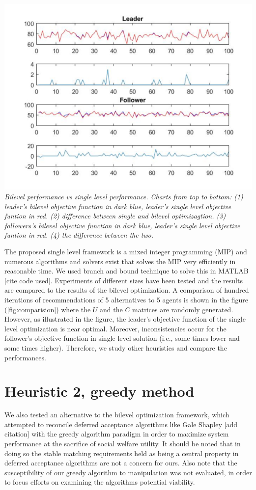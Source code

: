 \documentclass[11pt, letterpaper]{article}
\begin{document}
\includegraphics[]{comparison.png}
\\
\caption{\emph{Bilevel performance vs single level performance. Charts from top to bottom: (1) leader's bilevel objective function in dark blue, leader's single level objective funtion in red. (2) difference between single and bilevel optimizagtion. (3) followers's bilevel objective function in dark blue, leader's single level objective funtion in red. (4) the difference between the two. }}   
\label{fig:comparision}
\noindent

The proposed single level framework is a mixed integer programming (MIP) and numerous algorithms and solvers exist that solves the MIP very efficiently in reasonable time. We used branch and bound technique to solve this in MATLAB [cite code used]. Experiments of different sizes have been tested and the results are compared to the results of the bilevel optimization. A comparison of hundred iterations of recommendations of 5 alternatives to 5 agents is shown in the figure (\ref{fig:comparision}) where the $U$ and the $C$ matrices are randomly generated. However, as illustrated in the figure, the leader's objective function of the single level optimization is near optimal. Moreover, inconsistencies occur for the follower's objective function in single level solution (i.e., some times lower and some times higher). Therefore, we study other heuristics and compare the performances. 

\section{Heuristic 2, greedy method}
We also tested an alternative to the bilevel optimization framework, which attempted to reconcile deferred acceptance algorithms like Gale Shapley [add citation] with the greedy algorithm paradigm in order to maximize system performance at the sacrifice of social welfare utility.  It should be noted that in doing so the stable matching requirements held as being a central property in deferred acceptance algorithms are not a concern for ours.  Also note that the susceptibility of our greedy algorithm to manipulation was not evaluated, in order to focus efforts on examining the algorithms potential viability.  
\end{document}
